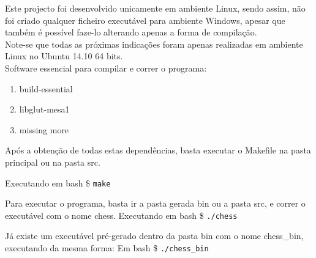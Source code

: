 \documentclass[portugues,final]{revdetua}
\begin{document}
Este projecto foi desenvolvido unicamente em ambiente Linux, sendo assim, não foi criado qualquer ficheiro executável para ambiente Windows, apesar que também é possível faze-lo alterando apenas a forma de compilação.\\

Note-se que todas as próximas indicações foram apenas realizadas em ambiente Linux no Ubuntu 14.10 64 bits.\\

Software essencial para compilar e correr o programa:
\begin{enumerate}
\item build-essential
\item libglut-mesa1
\item missing more
\end{enumerate}

Após a obtenção de todas estas dependências, basta executar o Makefile na pasta principal ou na pasta src.

Executando em bash \$ {\tt make}

Para executar o programa, basta ir a pasta gerada bin ou a pasta src, e correr o executável com o nome chess.
Executando em bash \$ {\tt ./chess}

Já existe um executável pré-gerado dentro da pasta bin com o nome chess\_bin, executando da mesma forma:
Em bash \$ {\tt ./chess\_bin}


\end{document}

